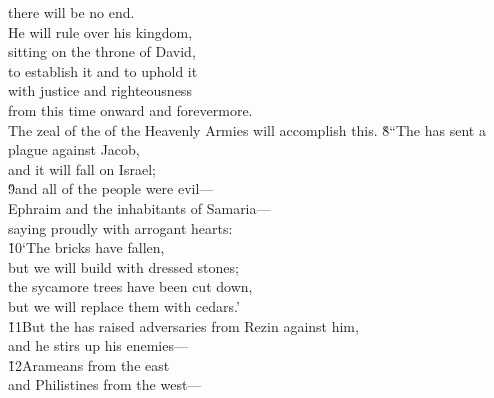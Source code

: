 \begin{poetry}
\poemll    there will be no end. \\
\poeml He will rule over his kingdom, \\
\poemll    sitting on the throne of David, \\
\poeml to establish it and to uphold it \\
\poemll    with justice and righteousness \\
\poemlll       from this time onward and forevermore. \\
\poeml The zeal of the  of the Heavenly Armies will accomplish this.
\poeml \v{8}``The  has sent a plague against Jacob, \\
\poemll    and it will fall on Israel; \\
\poeml \v{9}and all of the people were evil--- \\
\poemll    Ephraim and the inhabitants of Samaria--- \\
\poemlll       saying proudly with arrogant hearts: \\
\poeml \v{10}`The bricks have fallen, \\
\poemll    but we will build with dressed stones; \\
\poeml the sycamore trees have been cut down, \\
\poemll    but we will replace them with cedars.' \\
\poeml \v{11}But the  has raised adversaries from Rezin against him, \\
\poemll    and he stirs up his enemies--- \\
\poeml \v{12}Arameans from the east \\
\poemll    and Philistines from the west--- \\

\end{poetry}
